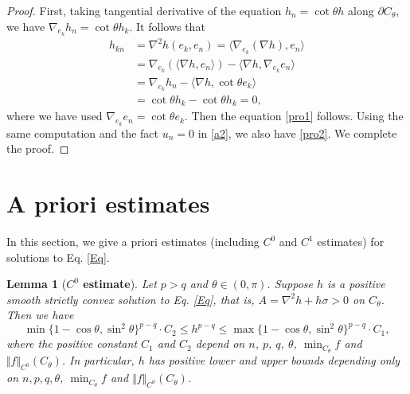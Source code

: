 \documentclass[11pt]{amsart}
\numberwithin{equation} {section}
\numberwithin{equation}{section}
\newtheorem{lemma}[theorem]{\bf Lemma}
\begin{document}
\begin{proof}
    First, taking tangential derivative of the equation $h_n = \cot\theta h$ along $\partial C_{\theta}$, we have $\nabla_{e_k}h_n = \cot\theta h_k$. It follows that 
    \begin{equation*}
\begin{split}
    h_{kn} &= \nabla^2 h(e_k,e_n) = \langle \nabla_{e_k}(\nabla h), e_n\rangle  \\ 
    &= 
    \nabla_{e_k}(\langle \nabla h, e_n\rangle) - \langle\nabla h,\nabla _{e_k}e_n\rangle \\ 
    &= \nabla_{e_k}h_n -\langle \nabla h, \cot\theta e_k\rangle \\ 
    &= 
    \cot\theta h_k - \cot\theta h_k = 0,
\end{split}
    \end{equation*}
    where we have used $\nabla_{e_k}e_n = \cot\theta e_k$. Then the equation \eqref{pro1} follows. Using the same computation and the fact $u_n =0$ in \eqref{a2}, we also have \eqref{pro2}. We complete the proof.
\end{proof}



\section{A priori estimates} \label{se3}
In this section, we give a priori estimates (including $C^0$ and $C^1$ estimates) for solutions to Eq. \eqref{Eq}.

\begin{lemma}[{\bf $C^0$ estimate}]\label{C0 estimate}
    Let $p>q$ and $\theta\in(0, \pi)$. Suppose $h$ is a positive smooth strictly convex solution to Eq. \eqref{Eq}, that is, $A=\nabla^2h+h\sigma>0$ on $C_{\theta}$. Then we have 
    \begin{equation}\label{a1}
       \min\{ 1-\cos\theta, \sin^2\theta\}^{p-q}\cdot C_2
        \leq h^{p-q}\leq
       \max\{ 1-\cos\theta, \sin^2\theta\}^{p-q}\cdot C_1 ,
    \end{equation}
    where the positive constant $C_1$ and $C_2$ depend on $n$, $p$, $q$, $\theta$, $\min_{C_{\theta}}f$ and $\Vert f\Vert_{C^0}(C_{\theta})$.
    In particular, $h$ has positive lower and upper bounds depending only on
    $n,p,q,\theta$, $\min_{C_{\theta}}f$ and $\Vert f\Vert_{C^0}(C_{\theta})$.
\end{lemma}
\end{document}
